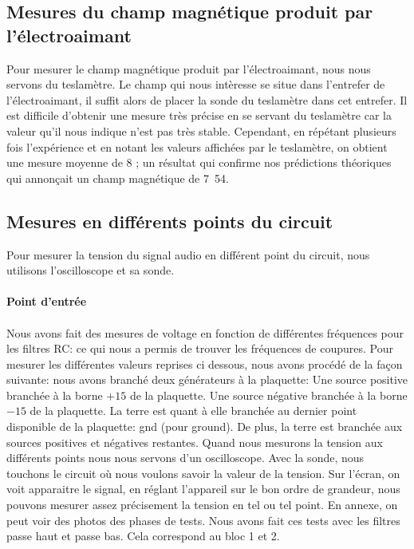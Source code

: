 \subsection{Mesures du champ magnétique produit par l'électroaimant}
Pour mesurer le champ magnétique produit par l'électroaimant, nous nous servons du teslamètre.
Le champ qui nous intèresse se situe dans l'entrefer de l'électroaimant, il suffit alors de placer
la sonde du teslamètre dans cet entrefer. Il est difficile d'obtenir une mesure très précise en se
servant du teslamètre car la valeur qu'il nous indique n'est pas très stable. Cependant, en répétant
plusieurs fois l'expérience et en notant les valeurs affichées par le teslamètre, on obtient une mesure
moyenne de \unit{8}{\centi\tesla} ; un résultat qui confirme nos prédictions théoriques
qui annonçait un champ magnétique de \unit{7.54}{\centi\tesla}.

\subsection{Mesures en différents points du circuit}
Pour mesurer la tension du signal audio en différent point du circuit, nous utilisons l'oscilloscope
et sa sonde.

\paragraph{Point d'entrée}

\paragraph{}


Nous avons fait des mesures de voltage en fonction de différentes fréquences pour les filtres RC: ce qui nous a permis
de trouver les fréquences de coupures. Pour mesurer les différentes valeurs reprises ci dessous, nous avons procédé de la
façon suivante: nous avons branché deux générateurs à la plaquette: Une source positive branchée à la borne $+15$ de la plaquette.
Une source négative branchée à la borne $-15$ de la plaquette. La terre est quant à elle branchée au dernier point
disponible de la plaquette: gnd (pour ground). De plus, la terre est branchée aux sources positives et négatives
restantes. Quand nous mesurons la tension aux différents points nous nous servons d'un oscilloscope. Avec la sonde,
nous touchons le circuit où nous voulons savoir la valeur de la tension. Sur l'écran, on voit apparaitre le
signal, en réglant l'appareil sur le bon ordre de grandeur, nous pouvons mesurer assez précisement la tension en
tel ou tel point. En annexe, on peut voir des photos des phases de tests.
  Nous avons fait ces tests avec les filtres
passe haut et passe bas. Cela correspond au bloc 1 et 2.

